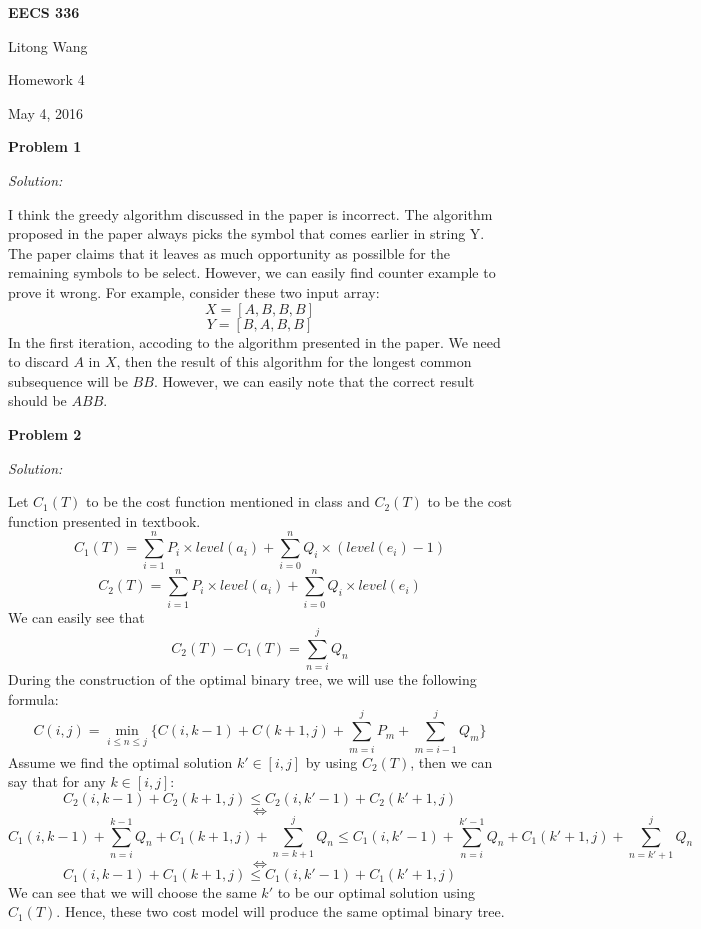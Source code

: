 \documentclass[12pt,letterpaper]{article}
\def\pp{\par\noindent}
\newcommand{\problem}[1]{ \bigskip \pp \textbf{Problem #1}\par}
\newcommand{\solution}{\textit{Solution:}\par}
\begin{document}
\centerline{\bf EECS 336}

\medskip
\centerline{Litong Wang}
\centerline{Homework 4}
\centerline{May 4, 2016}
\bigskip


\problem{1}
\solution
I think the greedy algorithm discussed in the paper is incorrect. The algorithm proposed in the paper always picks the symbol that comes earlier in string Y. \\
The paper claims that it leaves as much opportunity as possilble for the remaining symbols to be select. However, we can easily find counter example to prove it wrong. For example, consider these two input array: \\
$$X = [A,B,B,B]$$
$$Y = [B,A,B,B]$$
In the first iteration, accoding to the algorithm presented in the paper. We need to discard $A$ in $X$, then the result of this algorithm for the longest common subsequence will be $BB$. However, we can easily note that the correct result should be $ABB$.

\problem{2}
\solution
Let $C_1(T)$ to be the cost function mentioned in class and $C_2(T)$ to be the cost function presented in textbook. \\
$$C_1(T) = \sum_{i=1}^{n} P_i \times level(a_i) + \sum_{i=0}^{n} Q_i \times (level(e_i)-1) $$
$$C_2(T) = \sum_{i=1}^{n} P_i \times level(a_i) + \sum_{i=0}^{n} Q_i \times level(e_i) $$
We can easily see that \\ 
$$C_2(T) - C_1(T) = \sum_{ n = i }^{j} Q_n$$
During the construction of the optimal binary tree, we will use the following formula: \\
$$C(i,j) = \min_{i \le n \le j} \lbrace C(i,k-1) + C(k+1,j) + \sum_{m = i}^{j} P_m + \sum_{m = i - 1}^{j} Q_m \rbrace$$
Assume we find the optimal solution $k' \in [i,j] $ by using $C_2(T)$, then we can say that for any $k \in [i,j]$: \\
$$C_2(i,k-1) + C_2(k+1,j) \le C_2(i,k'-1) + C_2(k'+1,j)$$
$$\Leftrightarrow$$
$$C_1(i,k-1) + \sum_{ n = i }^{k-1} Q_n + C_1(k+1,j) + \sum_{ n = k+1 }^{j} Q_n \le C_1(i,k'-1) + \sum_{ n = i }^{k'-1} Q_n + C_1(k'+1,j) + \sum_{ n = k'+1 }^{j} Q_n$$
$$\Leftrightarrow$$
$$C_1(i,k-1) + C_1(k+1,j) \le C_1(i,k'-1) + C_1(k'+1,j)$$
We can see that we will choose the same $k'$ to be our optimal solution using $C_1(T)$. Hence, these two cost model will produce the same optimal binary tree.
\end{document}
